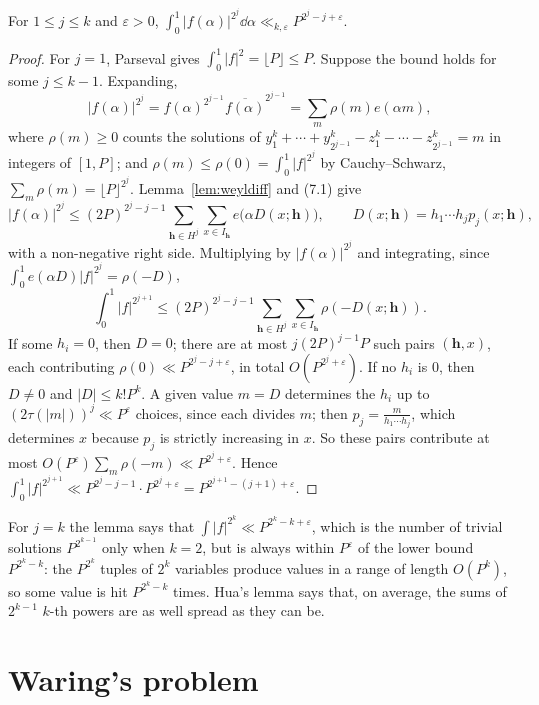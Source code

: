 \begin{theorem}[Hua, 1938]\label{thm:hua}
For $1\le j\le k$ and $\varepsilon>0$, $\displaystyle\int_0^1|f(\alpha)|^{2^j}\dd\alpha\ll_{k,\varepsilon}P^{2^j-j+\varepsilon}$.
\end{theorem}
\begin{proof}
For $j=1$, Parseval gives $\int_0^1|f|^2=\lfloor P\rfloor\le P$. Suppose the bound holds for some $j\le k-1$. Expanding,
\[
|f(\alpha)|^{2^j}=f(\alpha)^{2^{j-1}}\overline{f(\alpha)}^{2^{j-1}}=\sum_m\rho(m)e(\alpha m),
\]
where $\rho(m)\ge0$ counts the solutions of $y_1^k+\cdots+y_{2^{j-1}}^k-z_1^k-\cdots-z_{2^{j-1}}^k=m$ in integers of $[1,P]$; and $\rho(m)\le\rho(0)=\int_0^1|f|^{2^j}$ by Cauchy--Schwarz, $\sum_m\rho(m)=\lfloor P\rfloor^{2^j}$. Lemma~\ref{lem:weyldiff} and (7.1) give
\[
|f(\alpha)|^{2^j}\le(2P)^{2^j-j-1}\sum_{\mathbf h\in H^j}\sum_{x\in I_{\mathbf h}}e\bigl(\alpha D(x;\mathbf h)\bigr),\qquad D(x;\mathbf h)=h_1\cdots h_jp_j(x;\mathbf h),
\]
with a non-negative right side. Multiplying by $|f(\alpha)|^{2^j}$ and integrating, since $\int_0^1e(\alpha D)|f|^{2^j}=\rho(-D)$,
\[
\int_0^1|f|^{2^{j+1}}\le(2P)^{2^j-j-1}\sum_{\mathbf h\in H^j}\sum_{x\in I_{\mathbf h}}\rho(-D(x;\mathbf h)).
\]
If some $h_i=0$, then $D=0$; there are at most $j(2P)^{j-1}P$ such pairs $(\mathbf h,x)$, each contributing $\rho(0)\ll P^{2^j-j+\varepsilon}$, in total $O(P^{2^j+\varepsilon})$. If no $h_i$ is $0$, then $D\ne0$ and $|D|\le k!P^k$. A given value $m=D$ determines the $h_i$ up to $(2\tau(|m|))^j\ll P^\varepsilon$ choices, since each divides $m$; then $p_j=\frac m{h_1\cdots h_j}$, which determines $x$ because $p_j$ is strictly increasing in $x$. So these pairs contribute at most $O(P^\varepsilon)\sum_m\rho(-m)\ll P^{2^j+\varepsilon}$. Hence $\int_0^1|f|^{2^{j+1}}\ll P^{2^j-j-1}\cdot P^{2^j+\varepsilon}=P^{2^{j+1}-(j+1)+\varepsilon}$.
\end{proof}

For $j=k$ the lemma says that $\int|f|^{2^k}\ll P^{2^k-k+\varepsilon}$, which is the number of trivial solutions $P^{2^{k-1}}$ only when $k=2$, but is always within $P^\varepsilon$ of the lower bound $P^{2^k-k}$: the $P^{2^k}$ tuples of $2^k$ variables produce values in a range of length $O(P^k)$, so some value is hit $P^{2^k-k}$ times. Hua's lemma says that, on average, the sums of $2^{k-1}$ $k$-th powers are as well spread as they can be.

\section{Waring's problem}

